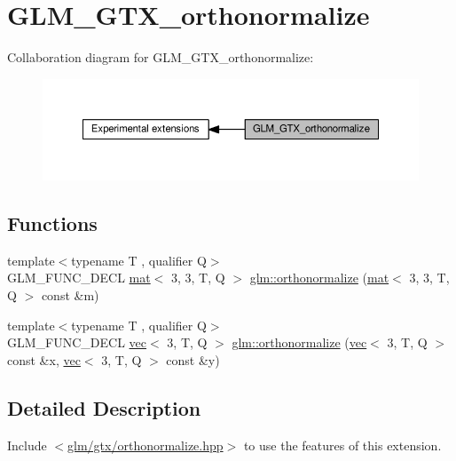 \hypertarget{group__gtx__orthonormalize}{}\section{G\+L\+M\+\_\+\+G\+T\+X\+\_\+orthonormalize}
\label{group__gtx__orthonormalize}
Collaboration diagram for G\+L\+M\+\_\+\+G\+T\+X\+\_\+orthonormalize\+:
\nopagebreak
\begin{figure}[H]
\begin{center}
\leavevmode
\includegraphics[width=350pt]{de/d35/group__gtx__orthonormalize}
\end{center}
\end{figure}
\subsection*{Functions}
\begin{DoxyCompactItemize}
\item 
{\footnotesize template$<$typename T , qualifier Q$>$ }\\G\+L\+M\+\_\+\+F\+U\+N\+C\+\_\+\+D\+E\+CL \hyperlink{structglm_1_1mat}{mat}$<$ 3, 3, T, Q $>$ \hyperlink{group__gtx__orthonormalize_ga4cab5d698e6e2eccea30c8e81c74371f}{glm\+::orthonormalize} (\hyperlink{structglm_1_1mat}{mat}$<$ 3, 3, T, Q $>$ const \&m)
\item 
{\footnotesize template$<$typename T , qualifier Q$>$ }\\G\+L\+M\+\_\+\+F\+U\+N\+C\+\_\+\+D\+E\+CL \hyperlink{structglm_1_1vec}{vec}$<$ 3, T, Q $>$ \hyperlink{group__gtx__orthonormalize_gac3bc7ef498815026bc3d361ae0b7138e}{glm\+::orthonormalize} (\hyperlink{structglm_1_1vec}{vec}$<$ 3, T, Q $>$ const \&x, \hyperlink{structglm_1_1vec}{vec}$<$ 3, T, Q $>$ const \&y)
\end{DoxyCompactItemize}


\subsection{Detailed Description}
Include $<$\hyperlink{orthonormalize_8hpp}{glm/gtx/orthonormalize.\+hpp}$>$ to use the features of this extension.

